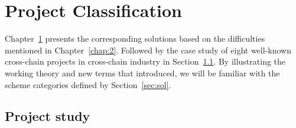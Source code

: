 \chapter{Project Classification} 
\label{chap:3}
\noindent Chapter~\ref{chap:3} presents the corresponding solutions based on the difficulties mentioned in Chapter~\ref{chap:2}. Followed by the case study of eight well-known cross-chain projects in cross-chain industry in Section~\ref{sec:ps}. By illustrating the working theory and new terms that introduced,  we will be familiar with the scheme categories defined by Section~\ref{sec:sol}.


\section{Project study}
\label{sec:ps}

